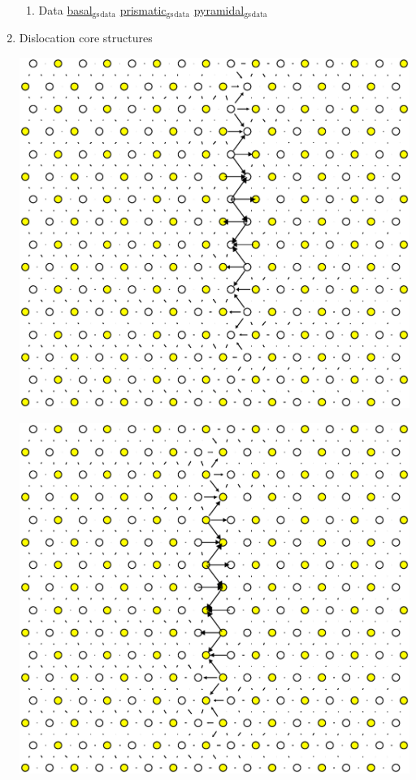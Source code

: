 \documentclass[11pt]{article}
\begin{document}
\begin{enumerate}
\begin{center}
\end{center}

\begin{enumerate}
\item Data
\label{sec:org1f9f16e}
\href{file:///home/tigany/Documents/ti/final\_model\_2019-11-12/results\_2019-11-09\_muc/gamma\_surfaces/basal/basal\_gs\_noo\_alat\_energies.dat}{basal\(_{\text{gs}}\)\(_{\text{data}}\)}
\href{file:///home/tigany/Documents/ti/final\_model\_2019-11-12/results\_2019-11-09\_muc/gamma\_surfaces/prismatic/prismatic\_gs\_noo\_alat\_energies.dat}{prismatic\(_{\text{gs}}\)\(_{\text{data}}\)}
\href{file:///home/tigany/Documents/ti/final\_model\_2019-11-12/gamma\_surfaces/pyramidal\_results\_2019-11-13/pyramidal\_gamma\_surface\_2019-11-13.dat}{pyramidal\(_{\text{gs}}\)\(_{\text{data}}\)}
\end{enumerate}
\item Dislocation core structures
\label{sec:orgfb6382d}
\begin{center}
\includegraphics[width=.9\linewidth]{Images/ddplot_IP1_noo_best_model_alat.eps}
\end{center}
\begin{center}
\includegraphics[width=.9\linewidth]{Images/ddplot_IP2_noo_best_model_alat.eps}

\end{center}
\end{enumerate}
\end{document}

